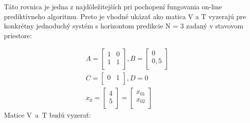 Táto rovnica je jedna z najdôležitejších pri pochopení fungovania on-line prediktívneho algoritmu. Preto je vhodné ukázať ako matica V a T vyzerajú pre konkrétny jednoduchý systém s horizontom predikcie N = 3 zadaný v stavovom priestore:

\begin{equation} \label{eq7}
\begin{split}
A = \begin{bmatrix}
1 & 0 \\
1 & 1 \\
\end{bmatrix}, 
B = \begin{bmatrix}
0 \\
0,5 \\
\end{bmatrix} \\
C = \begin{bmatrix}
0 & 1 \\
\end{bmatrix}, D = 0 \\
x_{0} = \begin{bmatrix}
4 \\
5 \\
\end{bmatrix} = \begin{bmatrix}
x_{01} \\
x_{02} \\
\end{bmatrix}
\end{split}
\end{equation}
Matice V~a~T budú vyzerať:
